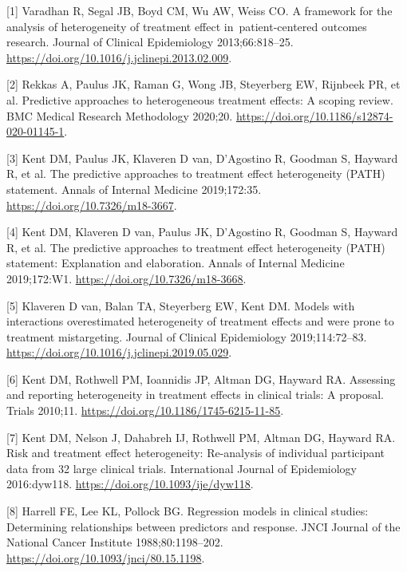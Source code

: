 \documentclass[]{elsarticle} %
\newenvironment{cslreferences}%
  {}%
  {\par}
\begin{document}
\hypertarget{refs}{}
\begin{cslreferences}
\leavevmode\hypertarget{ref-Varadhan2013}{}%
{[}1{]} Varadhan R, Segal JB, Boyd CM, Wu AW, Weiss CO. A framework for
the analysis of heterogeneity of treatment effect in~patient-centered
outcomes research. Journal of Clinical Epidemiology 2013;66:818--25.
\url{https://doi.org/10.1016/j.jclinepi.2013.02.009}.

\leavevmode\hypertarget{ref-Rekkas2020}{}%
{[}2{]} Rekkas A, Paulus JK, Raman G, Wong JB, Steyerberg EW, Rijnbeek
PR, et al. Predictive approaches to heterogeneous treatment effects: A
scoping review. BMC Medical Research Methodology 2020;20.
\url{https://doi.org/10.1186/s12874-020-01145-1}.

\leavevmode\hypertarget{ref-Kent2019}{}%
{[}3{]} Kent DM, Paulus JK, Klaveren D van, D'Agostino R, Goodman S,
Hayward R, et al. The predictive approaches to treatment effect
heterogeneity (PATH) statement. Annals of Internal Medicine 2019;172:35.
\url{https://doi.org/10.7326/m18-3667}.

\leavevmode\hypertarget{ref-PathEnE}{}%
{[}4{]} Kent DM, Klaveren D van, Paulus JK, D'Agostino R, Goodman S,
Hayward R, et al. The predictive approaches to treatment effect
heterogeneity (PATH) statement: Explanation and elaboration. Annals of
Internal Medicine 2019;172:W1. \url{https://doi.org/10.7326/m18-3668}.

\leavevmode\hypertarget{ref-vanKlaveren2019}{}%
{[}5{]} Klaveren D van, Balan TA, Steyerberg EW, Kent DM. Models with
interactions overestimated heterogeneity of treatment effects and were
prone to treatment mistargeting. Journal of Clinical Epidemiology
2019;114:72--83. \url{https://doi.org/10.1016/j.jclinepi.2019.05.029}.

\leavevmode\hypertarget{ref-Kent2010}{}%
{[}6{]} Kent DM, Rothwell PM, Ioannidis JP, Altman DG, Hayward RA.
Assessing and reporting heterogeneity in treatment effects in clinical
trials: A proposal. Trials 2010;11.
\url{https://doi.org/10.1186/1745-6215-11-85}.

\leavevmode\hypertarget{ref-Kent2016}{}%
{[}7{]} Kent DM, Nelson J, Dahabreh IJ, Rothwell PM, Altman DG, Hayward
RA. Risk and treatment effect heterogeneity: Re-analysis of individual
participant data from 32 large clinical trials. International Journal of
Epidemiology 2016:dyw118. \url{https://doi.org/10.1093/ije/dyw118}.

\leavevmode\hypertarget{ref-Harrell1988}{}%
{[}8{]} Harrell FE, Lee KL, Pollock BG. Regression models in clinical
studies: Determining relationships between predictors and response. JNCI
Journal of the National Cancer Institute 1988;80:1198--202.
\url{https://doi.org/10.1093/jnci/80.15.1198}.


\end{cslreferences}
\end{document}
